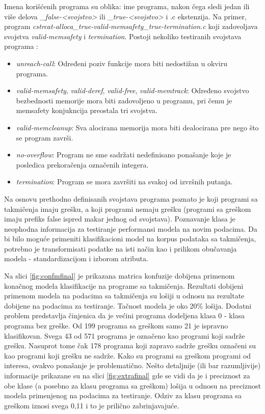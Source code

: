 \documentclass[12pt,oneside]{memoir}
\begin{document}
Imena korišćenih programa su oblika: ime programa, nakon čega sledi jedan ili više delova \textit{\_false-<svojstvo>} ili \textit{\_true-<svojstvo>} i .c ekstenzija. Na primer, program \textit{cstrcat-alloca\_true-valid-memsafety\_true-termination.c} koji zadovoljava svojstva \textit{valid-memsafety} i \textit{termination}. Postoji nekoliko testiranih svojstava programa \cite{benchmarks}:
\begin{itemize}
	\item \textit{unreach-call}: Određeni poziv funkcije mora biti nedostižan u okviru programa.
	\item \textit{valid-memsafety}, \textit{valid-deref}, \textit{valid-free}, \textit{valid-memtrack}: Određeno svojstvo bezbednosti memorije mora biti zadovoljeno u programu, pri čemu je memsafety konjukncija preostala tri svojstva.
	\item \textit{valid-memcleanup}: Sva alocirana memorija mora biti dealocirana pre nego što se program završi.
	\item \textit{no-overflow}: Program ne sme sadržati nedefinisano ponašanje koje je posledica prekoračenja označenih integera.
	\item \textit{termination}: Program se mora završiti na svakoj od izvršnih putanja.
\end{itemize}

Na osnovu prethodno definisanih svojstava programa poznato je koji programi sa takmičenja imaju grešku, a koji programi nemaju grešku (programi sa greškom imaju prefiks false ispred makar jednog od svojstava). Poznavanje klasa je neophodna informacija za testiranje performansi modela na novim podacima. Da bi bilo moguće primeniti klasifikacioni model na korpus podataka sa takmičenja, potrebno je transformisati podatke na isti način kao i prilikom obučavanja modela - standardizacijom i izborom atributa. 

Na slici \ref{fig:confmfinal} je prikazana matrica konfuzije dobijena primenom konačnog modela klasifikacije na programe sa takmičenja. Rezultati dobijeni primenom modela na podacima sa takmičenja su lošiji u odnosu na rezultate dobijene na podacima za testiranje. Tačnost modela je oko 20\% lošija. Dodatni problem predstavlja činjenica da je većini programa dodeljena klasa 0 - klasa programa bez greške. Od 199 programa sa greškom samo 21 je ispravno klasifikovan. Svega 43 od 571 programa je označeno kao programi koji sadrže grešku. Nasuprot tome čak 178 programa koji zapravo sadrže grešku označeni su kao programi koji grešku ne sadrže. Kako su programi sa greškom programi od interesa, ovakvo ponašanje je problematično. Nešto detaljnije (ili bar razumljivije) informacije prikazane su na slici \ref{fig:extrafinal} gde se vidi da je i preciznost za obe klase (a posebno za klasu programa sa greškom) lošija u odnosu na preciznost modela primenjenog na podacima za testiranje. Odziv za klasu programa sa greškom iznosi svega 0,11 i to je prilično zabrinjavajuće.
\end{document}
